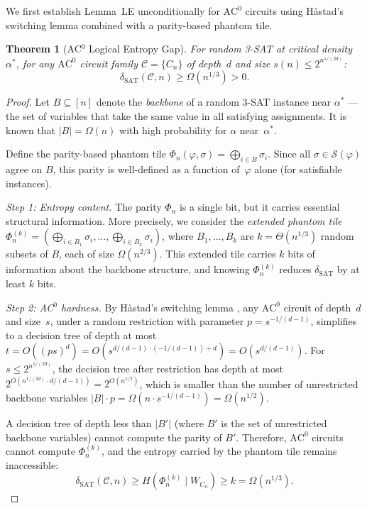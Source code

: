 \documentclass[11pt]{article}
\newtheorem{theorem}{Theorem}[section]
\theoremstyle{definition}
\theoremstyle{remark}
\newcommand{\calC}{\mathcal{C}}
\newcommand{\calS}{\mathcal{S}}
\newcommand{\ACz}{\mathrm{AC}^0}
\newcommand{\dSAT}{\delta_{\mathrm{SAT}}}
\begin{document}
We first establish Lemma~LE unconditionally for $\ACz$ circuits using
H\aa stad's switching lemma combined with a parity-based phantom tile.

\begin{theorem}[AC$^0$ Logical Entropy Gap]
\label{thm:ac0}
For random 3-SAT at critical density $\alpha^*$, for any $\ACz$ circuit
family $\calC = \{C_n\}$ of depth~$d$ and size $s(n) \leq 2^{n^{1/(2d)}}$:
\[
  \dSAT(\calC, n) \geq \Omega(n^{1/3}) > 0.
\]
\end{theorem}

\begin{proof}
Let $B \subseteq [n]$ denote the \emph{backbone} of a random 3-SAT instance
near $\alpha^*$ --- the set of variables that take the same value in all
satisfying assignments.  It is known \cite{ART} that $|B| = \Omega(n)$ with
high probability for $\alpha$ near~$\alpha^*$.

Define the parity-based phantom tile $\Phi_n(\varphi, \sigma) = \bigoplus_{i \in B} \sigma_i$.
Since all $\sigma \in \calS(\varphi)$ agree on $B$, this parity is well-defined
as a function of~$\varphi$ alone (for satisfiable instances).

\emph{Step 1: Entropy content.}  The parity $\Phi_n$ is a single bit, but it
carries essential structural information.  More precisely, we consider the
\emph{extended phantom tile} $\Phi_n^{(k)} = (\bigoplus_{i \in B_1} \sigma_i,
\ldots, \bigoplus_{i \in B_k} \sigma_i)$, where $B_1, \ldots, B_k$ are
$k = \Theta(n^{1/3})$ random subsets of $B$, each of size $\Omega(n^{2/3})$.
This extended tile carries $k$ bits of information about the backbone
structure, and knowing $\Phi_n^{(k)}$ reduces $\dSAT$ by at least $k$ bits.

\emph{Step 2: AC$^0$ hardness.}  By H\aa stad's switching lemma \cite{Hastad},
any $\ACz$ circuit of depth~$d$ and size~$s$, under a random restriction with
parameter $p = s^{-1/(d-1)}$, simplifies to a decision tree of depth at most
$t = O((ps)^d) = O(s^{d/(d-1) \cdot (-1/(d-1)) + d}) = O(s^{d/(d-1)})$.
For $s \leq 2^{n^{1/(2d)}}$, the decision tree after restriction has depth
at most $2^{O(n^{1/(2d)} \cdot d/(d-1))} = 2^{O(n^{1/2})}$, which is
smaller than the number of unrestricted backbone variables $|B| \cdot p
= \Omega(n \cdot s^{-1/(d-1)}) = \Omega(n^{1/2})$.

A decision tree of depth less than $|B'|$ (where $B'$ is the set of
unrestricted backbone variables) cannot compute the parity of $B'$.
Therefore, $\ACz$ circuits cannot compute $\Phi_n^{(k)}$, and the entropy
carried by the phantom tile remains inaccessible:
\[
  \dSAT(\calC, n) \geq H(\Phi_n^{(k)} \mid W_{C_n}) \geq k = \Omega(n^{1/3}).
\]
\end{proof}
\end{document}
